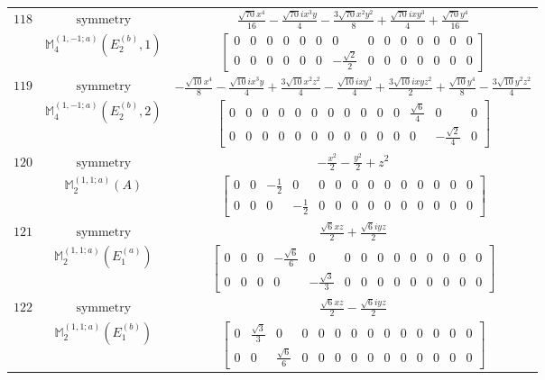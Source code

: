 \documentclass[fleqn,8pt,landscape]{jsarticle}
\begin{document}
\begin{longtable}{ccc}
$ 118 $ & $ \text{symmetry} $ & $ \frac{\sqrt{70} x^{4}}{16} - \frac{\sqrt{70} i x^{3} y}{4} - \frac{3 \sqrt{70} x^{2} y^{2}}{8} + \frac{\sqrt{70} i x y^{3}}{4} + \frac{\sqrt{70} y^{4}}{16} $ \\
$  $ & $ \mathbb{M}_{4}^{(1,-1;a)}(E_{2}^{(b)},1) $ & $ \begin{bmatrix} 0 & 0 & 0 & 0 & 0 & 0 & 0 & 0 & 0 & 0 & 0 & 0 & 0 & 0 \\ 0 & 0 & 0 & 0 & 0 & 0 & - \frac{\sqrt{2}}{2} & 0 & 0 & 0 & 0 & 0 & 0 & 0 \end{bmatrix} $ \\ \hline
$ 119 $ & $ \text{symmetry} $ & $ - \frac{\sqrt{10} x^{4}}{8} - \frac{\sqrt{10} i x^{3} y}{4} + \frac{3 \sqrt{10} x^{2} z^{2}}{4} - \frac{\sqrt{10} i x y^{3}}{4} + \frac{3 \sqrt{10} i x y z^{2}}{2} + \frac{\sqrt{10} y^{4}}{8} - \frac{3 \sqrt{10} y^{2} z^{2}}{4} $ \\
$  $ & $ \mathbb{M}_{4}^{(1,-1;a)}(E_{2}^{(b)},2) $ & $ \begin{bmatrix} 0 & 0 & 0 & 0 & 0 & 0 & 0 & 0 & 0 & 0 & 0 & \frac{\sqrt{6}}{4} & 0 & 0 \\ 0 & 0 & 0 & 0 & 0 & 0 & 0 & 0 & 0 & 0 & 0 & 0 & - \frac{\sqrt{2}}{4} & 0 \end{bmatrix} $ \\ \hline
$ 120 $ & $ \text{symmetry} $ & $ - \frac{x^{2}}{2} - \frac{y^{2}}{2} + z^{2} $ \\
$  $ & $ \mathbb{M}_{2}^{(1,1;a)}(A) $ & $ \begin{bmatrix} 0 & 0 & - \frac{1}{2} & 0 & 0 & 0 & 0 & 0 & 0 & 0 & 0 & 0 & 0 & 0 \\ 0 & 0 & 0 & - \frac{1}{2} & 0 & 0 & 0 & 0 & 0 & 0 & 0 & 0 & 0 & 0 \end{bmatrix} $ \\ \hline
$ 121 $ & $ \text{symmetry} $ & $ \frac{\sqrt{6} x z}{2} + \frac{\sqrt{6} i y z}{2} $ \\
$  $ & $ \mathbb{M}_{2}^{(1,1;a)}(E_{1}^{(a)}) $ & $ \begin{bmatrix} 0 & 0 & 0 & - \frac{\sqrt{6}}{6} & 0 & 0 & 0 & 0 & 0 & 0 & 0 & 0 & 0 & 0 \\ 0 & 0 & 0 & 0 & - \frac{\sqrt{3}}{3} & 0 & 0 & 0 & 0 & 0 & 0 & 0 & 0 & 0 \end{bmatrix} $ \\ \hline
$ 122 $ & $ \text{symmetry} $ & $ \frac{\sqrt{6} x z}{2} - \frac{\sqrt{6} i y z}{2} $ \\
$  $ & $ \mathbb{M}_{2}^{(1,1;a)}(E_{1}^{(b)}) $ & $ \begin{bmatrix} 0 & \frac{\sqrt{3}}{3} & 0 & 0 & 0 & 0 & 0 & 0 & 0 & 0 & 0 & 0 & 0 & 0 \\ 0 & 0 & \frac{\sqrt{6}}{6} & 0 & 0 & 0 & 0 & 0 & 0 & 0 & 0 & 0 & 0 & 0 \end{bmatrix} $ \\ \hline

\end{longtable}
\end{document}
